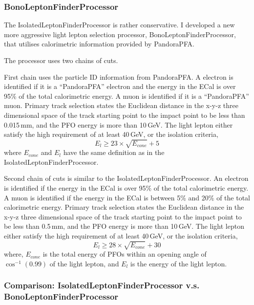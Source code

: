 \subsubsection{BonoLeptonFinderProcessor}

The IsolatedLeptonFinderProcessor is rather conservative. I developed a new more aggressive light lepton selection processor, BonoLeptonFinderProcessor, that utilises calorimetric information provided by PandoraPFA.

The processor uses two chains of cuts.

First chain uses the particle ID information from PandoraPFA. A electron is identified if it is a ``PandoraPFA'' electron and the energy in the ECal is over 95\% of the total calorimetric energy. A muon is identified if it is a ``PandoraPFA'' muon.  Primary track selection states the Euclidean distance in the x-y-z three dimensional space of the track starting point to the impact point to be less than 0.015\,mm, and the PFO energy is more than 10\,GeV. The light lepton either satisfy the high \pT requirement of at least 40\,GeV, or the isolation criteria,
\begin{equation}
E_{l} \geqslant 23 \times \sqrt{E_{cone}} + 5
\end{equation}
where $E_{cone}$ and $E_{l}$ have the same definition as in the IsolatedLeptonFinderProcessor.

Second chain of cuts is similar to the IsolatedLeptonFinderProcessor. An electron is identified if the energy in the ECal is over 95\% of the total calorimetric energy. A muon is identified if the energy in the ECal is between 5\% and 20\% of the total calorimetric energy. Primary track selection states the Euclidean distance in the x-y-z three dimensional space of the track starting point to the impact point to be less than 0.5\,mm, and the PFO energy is more than 10\,GeV. The light lepton either satisfy the high \pT requirement of at least 40\,GeV, or the isolation criteria,
\begin{equation}
E_{l} \geqslant 28 \times \sqrt{E_{cone}} + 30
\end{equation}
where, $E_{cone}$ is the total energy of PFOs within an opening angle of $\cos^{-1}(0.99)$ of the light lepton, and $E_{l}$ is the energy of the light lepton.

\subsubsection{Comparison: IsolatedLeptonFinderProcessor v.s. BonoLeptonFinderProcessor}

